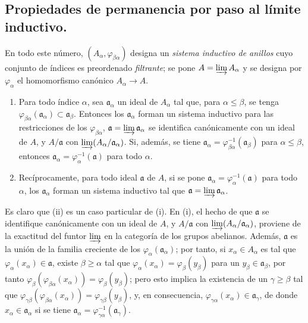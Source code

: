 \subsection{Propiedades de permanencia por paso al límite inductivo.}

En todo este número, $(A_\alpha,\varphi_{\beta\alpha})$ designa un \emph{sistema
inductivo de anillos} cuyo conjunto de índices es preordenado \emph{filtrante}; se pone
$A=\varinjlim A_\alpha$ y se designa por $\varphi_\alpha$ el homomorfismo
canónico $A_\alpha\to A$.

\begin{proposition}[5.13.1]
\label{IV.2.s5.13.1-fr}
\begin{enumerate}
\item[\textup{(i)}] Para todo índice $\alpha$, sea $\mathfrak a_\alpha$ un ideal de
$A_\alpha$ tal que, para $\alpha\leq\beta$, se tenga
$\varphi_{\beta\alpha}(\mathfrak a_\alpha)\subset\mathfrak a_\beta$.
Entonces los $\mathfrak a_\alpha$ forman un sistema inductivo para las
restricciones de los $\varphi_{\beta\alpha}$,
$\mathfrak a=\varinjlim\mathfrak a_\alpha$ se identifica canónicamente con un
ideal de $A$, y $A/\mathfrak a$ con
$\varinjlim(A_\alpha/\mathfrak a_\alpha)$. Si, además, se tiene
$\mathfrak a_\alpha=\varphi_{\beta\alpha}^{-1}(\mathfrak a_\beta)$ para
$\alpha\leq\beta$, entonces
$\mathfrak a_\alpha=\varphi_\alpha^{-1}(\mathfrak a)$ para todo $\alpha$.
\item[\textup{(ii)}] Recíprocamente, para todo ideal $\mathfrak a$ de $A$, si se pone
$\mathfrak a_\alpha=\varphi_\alpha^{-1}(\mathfrak a)$ para todo $\alpha$, los
$\mathfrak a_\alpha$ forman un sistema inductivo tal que
$\mathfrak a=\varinjlim\mathfrak a_\alpha$.
\end{enumerate}
\end{proposition}

Es claro que (ii) es un caso particular de (i). En (i), el hecho de que
$\mathfrak a$ se identifique canónicamente con un ideal de $A$, y
$A/\mathfrak a$ con $\varinjlim(A_\alpha/\mathfrak a_\alpha)$, proviene de la
exactitud del funtor $\varinjlim$ en la categoría de los grupos abelianos.
Además, $\mathfrak a$ es la unión de la familia creciente de los
$\varphi_\alpha(\mathfrak a_\alpha)$; por tanto, si
$x_\alpha\in A_\alpha$ es tal que
$\varphi_\alpha(x_\alpha)\in\mathfrak a$, existe $\beta\geq\alpha$ tal que
$\varphi_\alpha(x_\alpha)=\varphi_\beta(y_\beta)$ para un
$y_\beta\in\mathfrak a_\beta$, por tanto
$\varphi_\beta(\varphi_{\beta\alpha}(x_\alpha))=\varphi_\beta(y_\beta)$;
pero esto implica la existencia de un $\gamma\geq\beta$ tal que
$\varphi_{\gamma\beta}(\varphi_{\beta\alpha}(x_\alpha))=\varphi_{\gamma\beta}(y_\beta)$,
y, en consecuencia,
$\varphi_{\gamma\alpha}(x_\alpha)\in\mathfrak a_\gamma$, de donde
$x_\alpha\in\mathfrak a_\alpha$ si se tiene
$\mathfrak a_\alpha=\varphi_{\gamma\alpha}^{-1}(\mathfrak a_\gamma)$.


